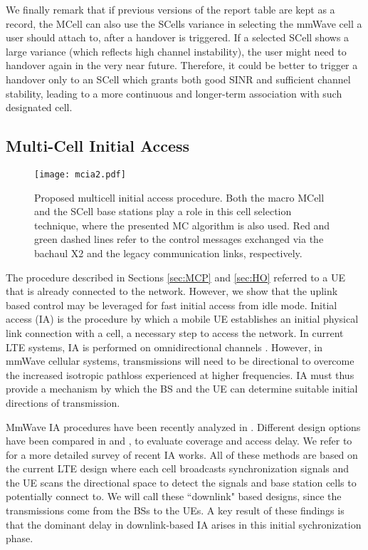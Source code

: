 \documentclass[conference,a4paper]{IEEEtran}
\begin{document}
We finally remark that if previous versions of the report table are kept as a record, the  MCell can also use the SCells variance in selecting the mmWave cell a user should attach to, after a handover is triggered. If a selected SCell shows a large variance (which reflects high channel instability), the user might need to handover again in the very near future. Therefore, it could be better to trigger a handover only to an SCell which grants both good SINR and sufficient channel stability, leading to a more continuous and longer-term association with such designated cell.



\subsection{Multi-Cell Initial Access}
\label{sec:MC-IA}

\begin{figure}[t!]
\centering
 \texttt{[image: mcia2.pdf]}
 \caption{Proposed multicell initial access procedure. Both the macro MCell and the SCell  base stations play a role in this cell selection technique, where the presented MC algorithm is also used. Red and green dashed lines refer to the control messages exchanged via the bachaul X2 and the legacy communication links, respectively.}
 \label{fig:initial_access_procedure}
\end{figure}


The  procedure described in Sections \ref{sec:MCP} and \ref{sec:HO} referred to a UE that is already connected to the network.
However, we show that the uplink based control may be leveraged for fast initial access
from idle mode.
Initial access (IA) is the procedure by which a mobile UE establishes an initial 
physical link connection with a cell, a necessary step to access the network.
In current LTE systems, IA is performed on omnidirectional channels \cite{LTE_book}. 
However, in mmWave cellular systems, transmissions will need to be directional 
to overcome the increased isotropic pathloss experienced at higher frequencies.
IA must thus 
provide a mechanism by which the BS and the UE can determine suitable initial directions of transmission.




MmWave IA  procedures have been recently analyzed in \cite{Barati,barati2015initial,Capone,alk}. 
Different design options have been compared in \cite{CISS} and \cite{magazine_IA}, to evaluate coverage and access delay. We refer to \cite{magazine_IA} for a more detailed survey of recent IA works.
All of these methods are based on the current LTE design where each cell broadcasts
synchronization signals and the UE scans the directional space to detect the signals
and base station cells to potentially connect to.
We will call these ``downlink" based designs, since the transmissions come from the 
BSs to the UEs.
A key result of these findings is that the dominant delay in downlink-based IA arises in this initial 
sychronization phase.
\end{document}
